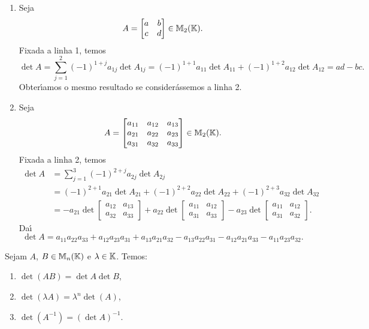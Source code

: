 \begin{exemplo}
	\begin{enumerate}[label={\arabic*})]
		\item Seja
		\[
			A =
			\begin{bmatrix}
				a & b\\
				c & d
			\end{bmatrix} \in \mathbb{M}_2(\mathbb{K}).
		\]
		Fixada a linha 1, temos
		\[
			\det A = \sum_{j = 1}^2(-1)^{1 + j}a_{1j}\det A_{1j} = (-1)^{1 + 1}a_{11}\det A_{11} + (-1)^{1 + 2}a_{12}\det A_{12} = ad - bc.
		\]
		Obter{\'\i}amos o mesmo resultado se consider\'assemos a linha 2.

		\item Seja
		\[
			A =
			\begin{bmatrix}
				a_{11} & a_{12} & a_{13}\\
				a_{21} & a_{22} & a_{23}\\
				a_{31} & a_{32} & a_{33}
			\end{bmatrix} \in \mathbb{M}_2(\mathbb{K}).
		\]
		Fixada a linha 2, temos
		\begin{align*}
			\det A &= \sum_{j = 1}^3(-1)^{2 + j}a_{2j}\det A_{2j} \\ &= (-1)^{2 + 1}a_{21}\det A_{21} + (-1)^{2 + 2}a_{22}\det A_{22} + (-1)^{2 + 3}a_{32}\det A_{32}\\ &= -a_{21}\det\begin{bmatrix}a_{12} & a_{13}\\a_{32} & a_{33}\end{bmatrix} + a_{22}\det\begin{bmatrix}a_{11} & a_{12}\\a_{31} & a_{33}\end{bmatrix} - a_{23}\det\begin{bmatrix}a_{11} & a_{12}\\a_{31} & a_{32}\end{bmatrix}.
		\end{align*}
		Da{\'\i}
		\[
			\det A = a_{11}a_{22}a_{33} + a_{12}a_{23}a_{31} + a_{13}a_{21}a_{32} - a_{13}a_{22}a_{31} - a_{12}a_{21}a_{33} - a_{11}a_{23}a_{32}.
		\]
	\end{enumerate}
\end{exemplo}

\begin{proposicao}
	Sejam $A$, $B \in \mathbb{M}_n(\mathbb{K})$ e $\lambda \in \mathbb{K}$. Temos:
	\begin{enumerate}[label={\roman*})]
		\item $\det(AB) = \det A \det B$,
		\item $\det(\lambda A) = \lambda^n \det(A)$,
		\item $\det(A^{-1}) = (\det A)^{-1}$.
	\end{enumerate}
\end{proposicao}


